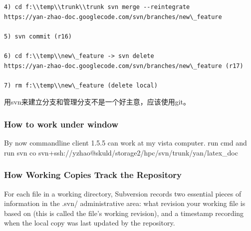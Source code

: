 \documentclass[a4paper,12pt,twoside]{book}
\begin{document}
\begin{CJK*}{UTF8}{song}
\begin{verbatim}
4) cd f:\\temp\\trunk\\trunk svn merge --reintegrate
https://yan-zhao-doc.googlecode.com/svn/branches/new\_feature

5) svn commit (r16)

6) cd f:\\temp\\new\_feature -> svn delete
https://yan-zhao-doc.googlecode.com/svn/branches/new\_feature (r17)

7) rm f:\\temp\\new\_feature (delete local)
\end{verbatim}
用svn来建立分支和管理分支不是一个好主意，应该使用git。

\subsubsection{How to work under window}
By now commandline client 1.5.5 can work at my vista computer.
run cmd
and run svn co svn+ssh://yzhao@skuld/storage2/hpc/svn/trunk/yan/latex\_doc

\subsubsection{How Working Copies Track the Repository}
For each file in a working directory, Subversion records two essential pieces of information in the .svn/ administrative area:
      what revision your working file is based on (this is called the file's working revision), and
      a timestamp recording when the local copy was last updated by the repository.


\end{CJK*}
\end{document}
